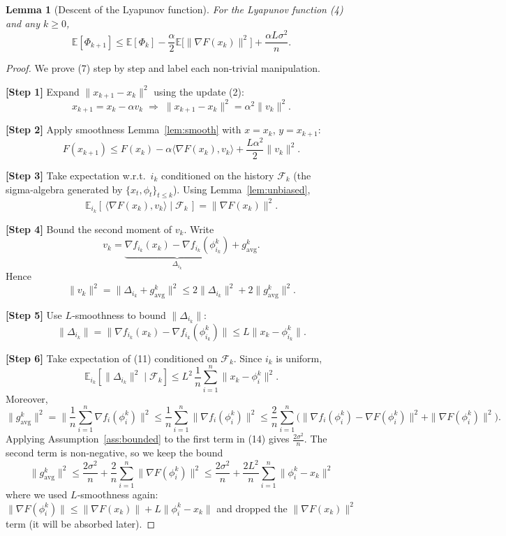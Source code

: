 \documentclass{article}
\newtheorem{lemma}{Lemma}
\newcommand{\E}{\mathbb{E}}
\begin{document}
\begin{lemma}[Descent of the Lyapunov function]\label{lem:descent}
For the Lyapunov function (4) and any $k\ge0$,
\[
\E[\Phi_{k+1}]\le \E[\Phi_k]-\frac{\alpha}{2}\E\big[\|\nabla F(x_k)\|^{2}\big]
+\frac{\alpha L\sigma^{2}}{n}.
\tag{7}
\]
\end{lemma}
\begin{proof}
We prove (7) step by step and label each non‑trivial manipulation.

\noindent\textbf{[Step 1]} Expand $\|x_{k+1}-x_k\|^{2}$ using the update (2):
\[
x_{k+1}=x_k-\alpha v_k\;\Longrightarrow\;
\|x_{k+1}-x_k\|^{2}=\alpha^{2}\|v_k\|^{2}.
\tag{8}
\]

\noindent\textbf{[Step 2]} Apply smoothness Lemma~\ref{lem:smooth} with $x=x_k$, $y=x_{k+1}$:
\[
F(x_{k+1})\le F(x_k)-\alpha\langle\nabla F(x_k),v_k\rangle
+\frac{L\alpha^{2}}{2}\|v_k\|^{2}.
\tag{9}
\]

\noindent\textbf{[Step 3]} Take expectation w.r.t.\ $i_k$ conditioned on the history $\mathcal{F}_k$ (the sigma‑algebra generated by $\{x_t,\phi_t\}_{t\le k}$). Using Lemma~\ref{lem:unbiased},
\[
\E_{i_k}[\,\langle\nabla F(x_k),v_k\rangle\mid\mathcal{F}_k\,]
= \|\nabla F(x_k)\|^{2}.
\tag{10}
\]

\noindent\textbf{[Step 4]} Bound the second moment of $v_k$. Write
\[
v_k
= \underbrace{\nabla f_{i_k}(x_k)-\nabla f_{i_k}(\phi_{i_k}^{k})}_{\Delta_{i_k}}
+g_{\text{avg}}^{k}.
\]
Hence
\[
\|v_k\|^{2}
= \|\Delta_{i_k}+g_{\text{avg}}^{k}\|^{2}
\le 2\|\Delta_{i_k}\|^{2}+2\|g_{\text{avg}}^{k}\|^{2}.
\tag{11}
\]

\noindent\textbf{[Step 5]} Use $L$‑smoothness to bound $\|\Delta_{i_k}\|$:
\[
\|\Delta_{i_k}\|
= \|\nabla f_{i_k}(x_k)-\nabla f_{i_k}(\phi_{i_k}^{k})\|
\le L\|x_k-\phi_{i_k}^{k}\|.
\tag{12}
\]

\noindent\textbf{[Step 6]} Take expectation of (11) conditioned on $\mathcal{F}_k$.
Since $i_k$ is uniform,
\[
\E_{i_k}[\|\Delta_{i_k}\|^{2}\mid\mathcal{F}_k]
\le L^{2}\,\frac1n\sum_{i=1}^{n}\|x_k-\phi_i^{k}\|^{2}.
\tag{13}
\]
Moreover,
\[
\|g_{\text{avg}}^{k}\|^{2}
= \Big\|\frac1n\sum_{i=1}^{n}\nabla f_i(\phi_i^{k})\Big\|^{2}
\le \frac1n\sum_{i=1}^{n}\|\nabla f_i(\phi_i^{k})\|^{2}
\le \frac{2}{n}\sum_{i=1}^{n}\Big(\|\nabla f_i(\phi_i^{k})-\nabla F(\phi_i^{k})\|^{2}
+\|\nabla F(\phi_i^{k})\|^{2}\Big).
\tag{14}
\]
Applying Assumption~\ref{ass:bounded} to the first term in (14) gives $\frac{2\sigma^{2}}{n}$.
The second term is non‑negative, so we keep the bound
\[
\|g_{\text{avg}}^{k}\|^{2}\le \frac{2\sigma^{2}}{n}+ \frac{2}{n}\sum_{i=1}^{n}\|\nabla F(\phi_i^{k})\|^{2}
\le \frac{2\sigma^{2}}{n}+ \frac{2L^{2}}{n}\sum_{i=1}^{n}\|\phi_i^{k}-x_k\|^{2}
\tag{15}
\]
where we used $L$‑smoothness again: $\|\nabla F(\phi_i^{k})\|\le \|\nabla F(x_k)\|+L\|\phi_i^{k}-x_k\|$ and dropped the $\|\nabla F(x_k)\|^{2}$ term (it will be absorbed later).


\end{proof}
\end{document}
